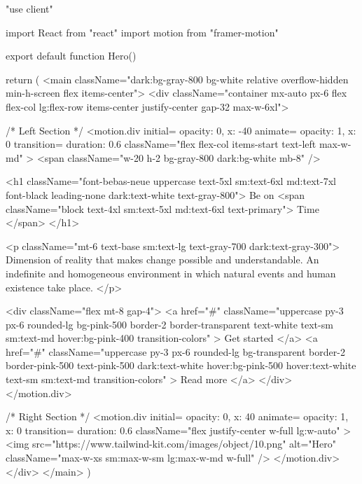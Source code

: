 "use client"

import React from "react"
import { motion } from "framer-motion"

export default function Hero() {
    return (
        <main className="dark:bg-gray-800 bg-white relative overflow-hidden min-h-screen flex items-center">
            <div className="container mx-auto px-6 flex flex-col lg:flex-row items-center justify-center gap-32 max-w-6xl">

                {/* Left Section */}
                <motion.div
                    initial={{ opacity: 0, x: -40 }}
                    animate={{ opacity: 1, x: 0 }}
                    transition={{ duration: 0.6 }}
                    className="flex flex-col items-start text-left max-w-md"
                >
                    <span className="w-20 h-2 bg-gray-800 dark:bg-white mb-8" />

                    <h1 className="font-bebas-neue uppercase text-5xl sm:text-6xl md:text-7xl font-black leading-none dark:text-white text-gray-800">
                        Be on
                        <span className="block text-4xl sm:text-5xl md:text-6xl text-primary">
                            Time
                        </span>
                    </h1>

                    <p className="mt-6 text-base sm:text-lg text-gray-700 dark:text-gray-300">
                        Dimension of reality that makes change possible and understandable.
                        An indefinite and homogeneous environment in which natural events
                        and human existence take place.
                    </p>

                    <div className="flex mt-8 gap-4">
                        <a
                            href="#"
                            className="uppercase py-3 px-6 rounded-lg bg-pink-500 border-2 border-transparent text-white text-sm sm:text-md hover:bg-pink-400 transition-colors"
                        >
                            Get started
                        </a>
                        <a
                            href="#"
                            className="uppercase py-3 px-6 rounded-lg bg-transparent border-2 border-pink-500 text-pink-500 dark:text-white hover:bg-pink-500 hover:text-white text-sm sm:text-md transition-colors"
                        >
                            Read more
                        </a>
                    </div>
                </motion.div>

                {/* Right Section */}
                <motion.div
                    initial={{ opacity: 0, x: 40 }}
                    animate={{ opacity: 1, x: 0 }}
                    transition={{ duration: 0.6 }}
                    className="flex justify-center w-full lg:w-auto"
                >
                    <img
                        src="https://www.tailwind-kit.com/images/object/10.png"
                        alt="Hero"
                        className="max-w-xs sm:max-w-sm lg:max-w-md w-full"
                    />
                </motion.div>
            </div>
        </main>
    )
}
